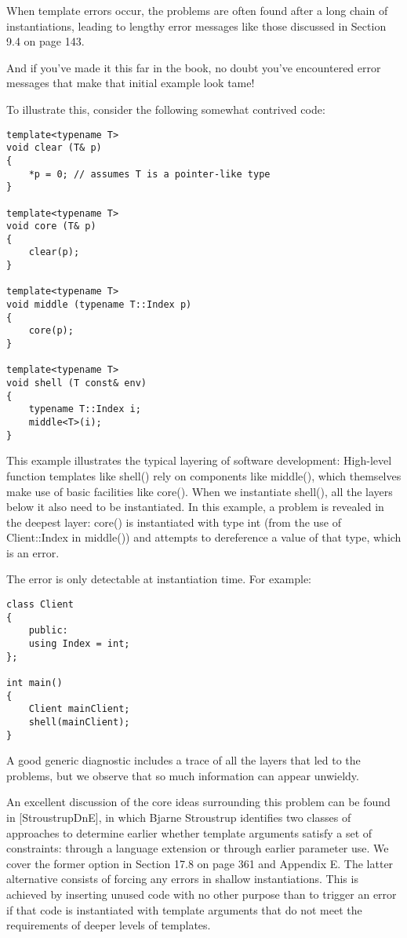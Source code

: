 When template errors occur, the problems are often found after a long chain of instantiations, leading to lengthy error messages like those discussed in Section 9.4 on page 143.

\begin{tcolorbox}[colback=webgreen!5!white,colframe=webgreen!75!black]
\hspace*{0.75cm}And if you’ve made it this far in the book, no doubt you’ve encountered error messages that make that initial example look tame!
\end{tcolorbox}

To illustrate this, consider the following somewhat contrived code:

\begin{lstlisting}[style=styleCXX]
template<typename T>
void clear (T& p)
{
	*p = 0; // assumes T is a pointer-like type
}

template<typename T>
void core (T& p)
{
	clear(p);
}

template<typename T>
void middle (typename T::Index p)
{
	core(p);
}

template<typename T>
void shell (T const& env)
{
	typename T::Index i;
	middle<T>(i);
}
\end{lstlisting}

This example illustrates the typical layering of software development: High-level function templates like shell() rely on components like middle(), which themselves make use of basic facilities like core(). When we instantiate shell(), all the layers below it also need to be instantiated. In this example, a problem is revealed in the deepest layer: core() is instantiated with type int (from the use of Client::Index in middle()) and attempts to dereference a value of that type, which is an error.

The error is only detectable at instantiation time. For example:

\begin{lstlisting}[style=styleCXX]
class Client
{
	public:
	using Index = int;
};

int main()
{
	Client mainClient;
	shell(mainClient);
}
\end{lstlisting}

A good generic diagnostic includes a trace of all the layers that led to the problems, but we observe that so much information can appear unwieldy.

An excellent discussion of the core ideas surrounding this problem can be found in [StroustrupDnE], in which Bjarne Stroustrup identifies two classes of approaches to determine earlier whether template arguments satisfy a set of constraints: through a language extension or through earlier parameter use. We cover the former option in Section 17.8 on page 361 and Appendix E. The latter alternative consists of forcing any errors in shallow instantiations. This is achieved by inserting unused code with no other purpose than to trigger an error if that code is instantiated with template arguments that do not meet the requirements of deeper levels of templates.

